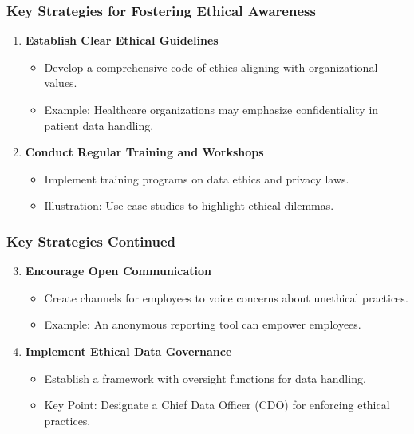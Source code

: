 \documentclass{beamer}
\begin{document}
\begin{frame}[fragile]
    \frametitle{Key Strategies for Fostering Ethical Awareness}
    \begin{enumerate}
        \item \textbf{Establish Clear Ethical Guidelines}
            \begin{itemize}
                \item Develop a comprehensive code of ethics aligning with organizational values.
                \item Example: Healthcare organizations may emphasize confidentiality in patient data handling.
            \end{itemize}
        
        \item \textbf{Conduct Regular Training and Workshops}
            \begin{itemize}
                \item Implement training programs on data ethics and privacy laws.
                \item Illustration: Use case studies to highlight ethical dilemmas.
            \end{itemize}
    \end{enumerate}
\end{frame}

\begin{frame}[fragile]
    \frametitle{Key Strategies Continued}
    \begin{enumerate} 
        \setcounter{enumi}{2} %
        \item \textbf{Encourage Open Communication}
            \begin{itemize}
                \item Create channels for employees to voice concerns about unethical practices.
                \item Example: An anonymous reporting tool can empower employees.
            \end{itemize}
        
        \item \textbf{Implement Ethical Data Governance}
            \begin{itemize}
                \item Establish a framework with oversight functions for data handling.
                \item Key Point: Designate a Chief Data Officer (CDO) for enforcing ethical practices.
            \end{itemize}
    \end{enumerate}
\end{frame}
\end{document}
